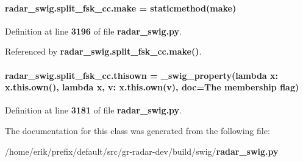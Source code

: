 \paragraph[{make}]{\setlength{\rightskip}{0pt plus 5cm}radar\+\_\+swig.\+split\+\_\+fsk\+\_\+cc.\+make = staticmethod(make)\hspace{0.3cm}{\ttfamily [static]}}\label{classradar__swig_1_1split__fsk__cc_a5f969c86e2d3c60a3c0218ab5a0f173a}


Definition at line {\bf 3196} of file {\bf radar\+\_\+swig.\+py}.



Referenced by {\bf radar\+\_\+swig.\+split\+\_\+fsk\+\_\+cc.\+make()}.

\paragraph[{thisown}]{\setlength{\rightskip}{0pt plus 5cm}radar\+\_\+swig.\+split\+\_\+fsk\+\_\+cc.\+thisown = {\bf \+\_\+swig\+\_\+property}(lambda x\+: x.\+this.\+own(), lambda {\bf x}, v\+: x.\+this.\+own(v), doc=\textquotesingle{}The membership flag\textquotesingle{})\hspace{0.3cm}{\ttfamily [static]}}\label{classradar__swig_1_1split__fsk__cc_ae027c46ba94640ec6ea181439a86d262}


Definition at line {\bf 3181} of file {\bf radar\+\_\+swig.\+py}.



The documentation for this class was generated from the following file\+:\begin{DoxyCompactItemize}
\item 
/home/erik/prefix/default/src/gr-\/radar-\/dev/build/swig/{\bf radar\+\_\+swig.\+py}\end{DoxyCompactItemize}
